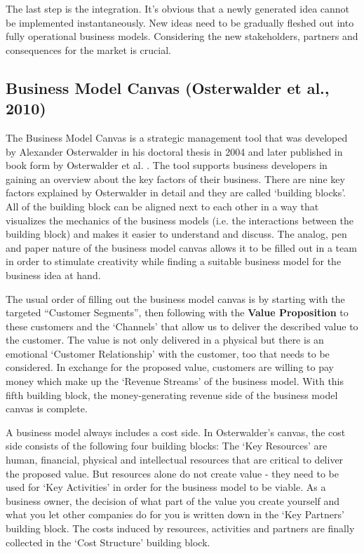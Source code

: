		The last step is the integration. It's obvious that a newly generated idea cannot be implemented instantaneously. New ideas need to be gradually fleshed out into fully operational business models. Considering the new stakeholders, partners and consequences for the market is crucial.

	\subsection{Business Model Canvas (Osterwalder et al., 2010)} 
	\label{sec:bmc}
		The Business Model Canvas is a strategic management tool that was developed by Alexander Osterwalder in his doctoral thesis in 2004 and later published in book form by Osterwalder et al. \cite{osterwalder}. The tool supports business developers in gaining an overview about the key factors of their business. There are nine key factors explained by Osterwalder in detail and they are called `building blocks'. All of the building block can be aligned next to each other in a way that visualizes the mechanics of the business models (i.e. the interactions between the building block) and makes it easier to understand and discuss. The analog, pen and paper nature of the business model canvas allows it to be filled out in a team in order to stimulate creativity while finding a suitable business model for the business idea at hand.

		The usual order of filling out the business model canvas \cite{bmc} is by starting with the targeted ``Customer Segments'', then following with the \textbf{Value Proposition} to these customers and the `Channels' that allow us to deliver the described value to the customer. The value is not only delivered in a physical but there is an emotional `Customer Relationship' with the customer, too that needs to be considered. In exchange for the proposed value, customers are willing to pay money which make up the `Revenue Streams' of the business model. With this fifth building block, the money-generating revenue side of the business model canvas is complete.

		A business model always includes a cost side. In Osterwalder's canvas, the cost side consists of the following four building blocks: The `Key Resources' are human, financial, physical and intellectual resources that are critical to deliver the proposed value. But resources alone do not create value - they need to be used for `Key Activities' in order for the business model to be viable. As a business owner, the decision of what part of the value you create yourself and what you let other companies do for you is written down in the `Key Partners' building block. The costs induced by resources, activities and partners are finally collected in the `Cost Structure' building block.

